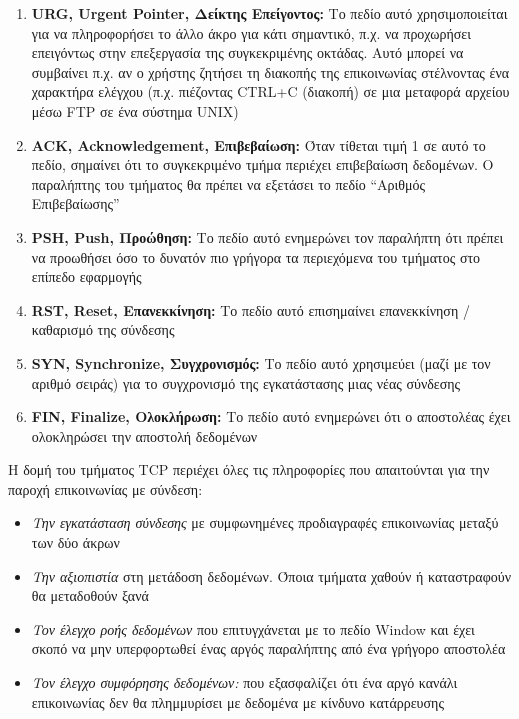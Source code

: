 \begin{itemize}
\begin{enumerate}
\item \textbf{URG, Urgent Pointer, Δείκτης Επείγοντος:} Το πεδίο αυτό χρησιμοποιείται για να πληροφορήσει το άλλο άκρο για κάτι σημαντικό, π.χ. να προχωρήσει επειγόντως στην επεξεργασία της συγκεκριμένης οκτάδας. Αυτό μπορεί να συμβαίνει π.χ. αν ο χρήστης ζητήσει τη διακοπής της επικοινωνίας στέλνοντας ένα χαρακτήρα ελέγχου (π.χ. πιέζοντας CTRL+C (διακοπή) σε μια μεταφορά αρχείου μέσω FTP σε ένα σύστημα UNIX)
\item \textbf{ACK, Acknowledgement, Επιβεβαίωση:} Όταν τίθεται τιμή 1 σε αυτό το πεδίο, σημαίνει ότι το συγκεκριμένο τμήμα περιέχει επιβεβαίωση δεδομένων. Ο παραλήπτης του τμήματος θα πρέπει να εξετάσει το πεδίο ``Αριθμός Επιβεβαίωσης''
\item \textbf{PSH, Push, Προώθηση:} Το πεδίο αυτό ενημερώνει τον παραλήπτη ότι πρέπει να προωθήσει όσο το δυνατόν πιο γρήγορα τα περιεχόμενα του τμήματος στο επίπεδο εφαρμογής
\item \textbf{RST, Reset, Επανεκκίνηση:} Το πεδίο αυτό επισημαίνει επανεκκίνηση / καθαρισμό της σύνδεσης
\item \textbf{SYN, Synchronize, Συγχρονισμός:} Το πεδίο αυτό χρησιμεύει (μαζί με τον αριθμό σειράς) για το συγχρονισμό της εγκατάστασης μιας νέας σύνδεσης
\item \textbf{FIN, Finalize, Ολοκλήρωση:} Το πεδίο αυτό ενημερώνει ότι ο αποστολέας έχει ολοκληρώσει την αποστολή δεδομένων
\end{enumerate}
\end{itemize}

Η δομή του τμήματος TCP περιέχει όλες τις πληροφορίες που απαιτούνται για την παροχή επικοινωνίας με σύνδεση:

\begin{itemize}
\item \emph{Την εγκατάσταση σύνδεσης} με συμφωνημένες προδιαγραφές επικοινωνίας μεταξύ των δύο άκρων
\item \emph{Την αξιοπιστία} στη μετάδοση δεδομένων. Όποια τμήματα χαθούν ή καταστραφούν θα μεταδοθούν ξανά
\item \emph{Τον έλεγχο ροής δεδομένων} που επιτυγχάνεται με το πεδίο Window και έχει σκοπό να μην υπερφορτωθεί ένας αργός παραλήπτης από ένα γρήγορο αποστολέα
\item \emph{Τον έλεγχο συμφόρησης δεδομένων:} που εξασφαλίζει ότι ένα αργό κανάλι επικοινωνίας δεν θα πλημμυρίσει με δεδομένα με κίνδυνο κατάρρευσης
\end{itemize} 